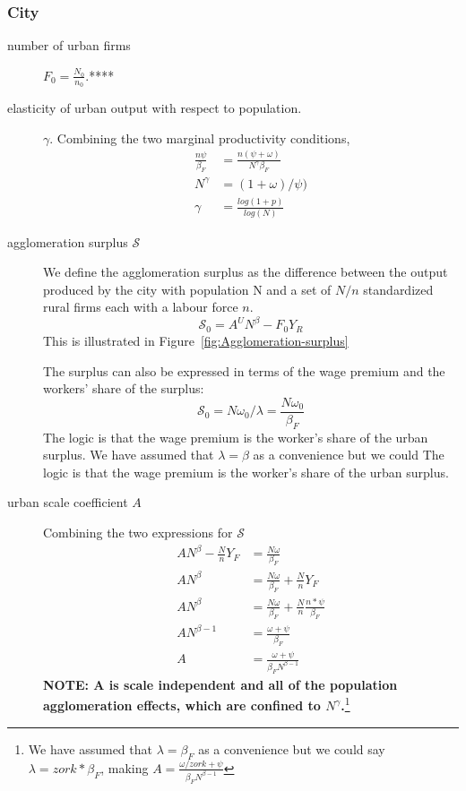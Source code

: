 \subsubsection{City}
\begin{description}

\item[number of urban firms] $F_0=\frac{N_0}{n_0}$.****

\item[elasticity of urban output with respect to population.] $\gamma$. Combining the two marginal productivity conditions, 
\begin{align}
\frac{n\psi}{\beta_F}  &= \frac{n(\psi+\omega)}{N^\gamma \beta_F}  \\
N^\gamma &= (1+\omega)/\psi)\\
\gamma &= \frac{log(1+p)}{log(N)}
\end{align}

\item [agglomeration surplus $\mathcal{S}$] We define the agglomeration surplus as the difference between the output produced by  the city with population N and a set of $N/n$ standardized rural firms each with a labour force $n$. 
\[\mathcal{S_0}=A^U N^\beta-F_0Y_R \] 
This is illustrated in Figure~\ref{fig:Agglomeration-surplus}

The surplus can also be expressed in terms of the wage premium and the workers' share of the surplus:
\[\mathcal{S_0}=N\omega_0/\lambda=\frac{N\omega_0}{\beta_F}\] 
The logic is that the wage premium is the worker's share of the urban surplus. We have assumed that $\lambda=\beta$ as a convenience but we could 
The logic is that the wage premium is the worker's share of the urban surplus. 

\item[urban scale coefficient $A$] Combining the two expressions for $\mathcal{S}$
\begin{align*}
 AN^\beta-\frac{N}{n}Y_F    &=\frac{N\omega}{\beta_F}\\ 
 AN^\beta   &=\frac{N\omega}{\beta_F} + \frac{N}{n}Y_F \\
 AN^\beta   &=\frac{N\omega}{\beta_F} + \frac{N}{n}\frac{n*\psi}{\beta_F}\\
AN^{\beta-1}   &=\frac{\omega+\psi}{\beta_F}\\ 
  A&=\frac{\omega+\psi}{\beta_FN^{\beta-1}}
\end{align*}
\textbf{NOTE: A is scale independent and all of the population agglomeration effects, which are confined to $N^\gamma$.}\footnote{We have assumed that $\lambda=\beta_F$ as a convenience but we could say $\lambda=zork*\beta_F$, making $A=\frac{\omega/zork +\psi}{\beta_FN^{\beta-1}}$ }
\end{description}


